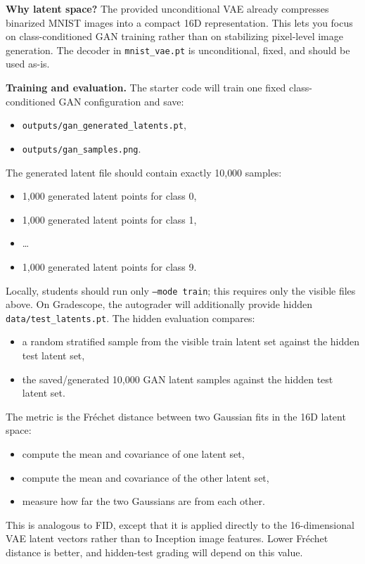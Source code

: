 \begin{Q}
\medskip
\noindent\textbf{Why latent space?}
The provided unconditional VAE already compresses binarized MNIST images into a compact 16D representation.
This lets you focus on class-conditioned GAN training rather than on stabilizing pixel-level image generation.
The decoder in \texttt{mnist\_vae.pt} is unconditional, fixed, and should be used as-is.

\medskip
\noindent\textbf{Training and evaluation.}
The starter code will train one fixed class-conditioned GAN configuration and save:
\begin{itemize}
\item \texttt{outputs/gan\_generated\_latents.pt},
\item \texttt{outputs/gan\_samples.png}.
\end{itemize}
The generated latent file should contain exactly 10{,}000 samples:
\begin{itemize}
\item 1{,}000 generated latent points for class 0,
\item 1{,}000 generated latent points for class 1,
\item \dots
\item 1{,}000 generated latent points for class 9.
\end{itemize}
Locally, students should run only \texttt{--mode train}; this requires only the visible files above.
On Gradescope, the autograder will additionally provide hidden \texttt{data/test\_latents.pt}.
The hidden evaluation compares:
\begin{itemize}
\item a random stratified sample from the visible train latent set against the hidden test latent set,
\item the saved/generated 10{,}000 GAN latent samples against the hidden test latent set.
\end{itemize}
The metric is the Fr\'echet distance between two Gaussian fits in the 16D latent space:
\begin{itemize}
\item compute the mean and covariance of one latent set,
\item compute the mean and covariance of the other latent set,
\item measure how far the two Gaussians are from each other.
\end{itemize}
This is analogous to FID, except that it is applied directly to the 16-dimensional VAE latent vectors rather than to Inception image features.
Lower Fr\'echet distance is better, and hidden-test grading will depend on this value.


\end{Q}
